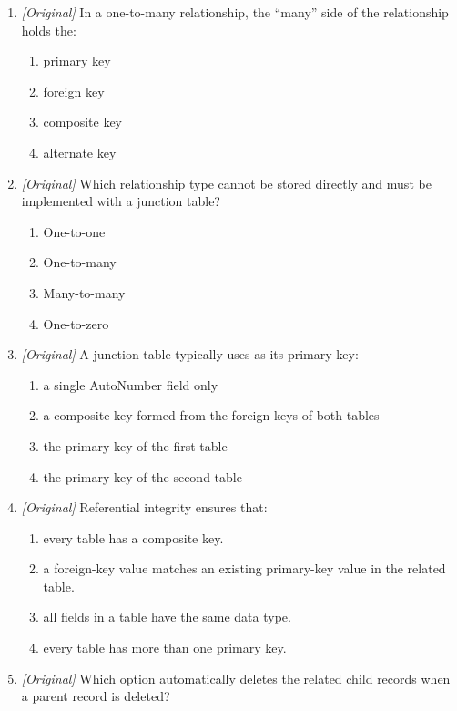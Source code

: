 \documentclass[11pt]{article}
\begin{document}
\begin{enumerate}[label=\textbf{Q\arabic*.}, leftmargin=*]
\begin{enumerate}[label=\Alph*.]
  \end{enumerate}
\item \textit{[Original]} In a one-to-many relationship, the ``many'' side of
  the relationship holds the:
  \begin{enumerate}[label=\Alph*.]
    \item primary key
    \item foreign key
    \item composite key
    \item alternate key
  \end{enumerate}
\item \textit{[Original]} Which relationship type cannot be stored directly
  and must be implemented with a junction table?
  \begin{enumerate}[label=\Alph*.]
    \item One-to-one
    \item One-to-many
    \item Many-to-many
    \item One-to-zero
  \end{enumerate}
\item \textit{[Original]} A junction table typically uses as its primary key:
  \begin{enumerate}[label=\Alph*.]
    \item a single AutoNumber field only
    \item a composite key formed from the foreign keys of both tables
    \item the primary key of the first table
    \item the primary key of the second table
  \end{enumerate}
\item \textit{[Original]} Referential integrity ensures that:
  \begin{enumerate}[label=\Alph*.]
    \item every table has a composite key.
    \item a foreign-key value matches an existing primary-key value in the
      related table.
    \item all fields in a table have the same data type.
    \item every table has more than one primary key.
  \end{enumerate}
\item \textit{[Original]} Which option automatically deletes the related child
  records when a parent record is deleted?
  \begin{enumerate}[label=\Alph*.]

\end{enumerate}
\end{enumerate}
\end{document}

